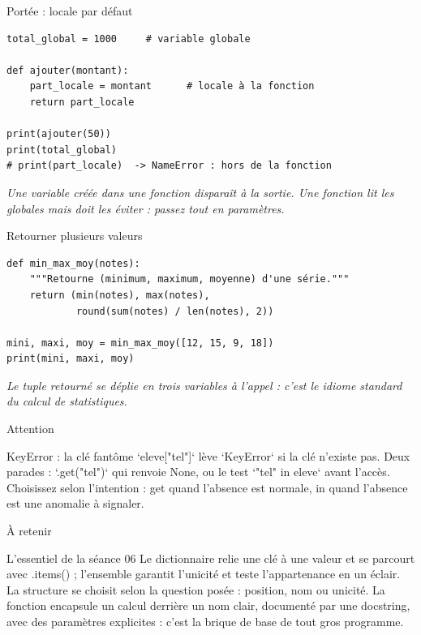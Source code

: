 \documentclass[aspectratio=169,11pt]{beamer}
\begin{document}
\begin{frame}[fragile]{Portée : locale par défaut}

\begin{lstlisting}[style=py]
total_global = 1000     # variable globale

def ajouter(montant):
    part_locale = montant      # locale à la fonction
    return part_locale

print(ajouter(50))
print(total_global)
# print(part_locale)  -> NameError : hors de la fonction
\end{lstlisting}
\vspace{0.5pt}

{\small\color{PyGris}\itshape Une variable créée dans une fonction disparaît à la sortie. Une fonction lit les globales mais doit les éviter : passez tout en paramètres.}

\end{frame}

\begin{frame}[fragile]{Retourner plusieurs valeurs}

\begin{lstlisting}[style=py]
def min_max_moy(notes):
    """Retourne (minimum, maximum, moyenne) d'une série."""
    return (min(notes), max(notes),
            round(sum(notes) / len(notes), 2))

mini, maxi, moy = min_max_moy([12, 15, 9, 18])
print(mini, maxi, moy)
\end{lstlisting}
\vspace{0.5pt}

{\small\color{PyGris}\itshape Le tuple retourné se déplie en trois variables à l'appel : c'est le idiome standard du calcul de statistiques.}

\end{frame}

\begin{frame}{Attention}
\begin{alertblock}{KeyError : la clé fantôme}
`eleve["tel"]` lève `KeyError` si la clé n'existe pas. Deux parades : `.get("tel")` qui renvoie None, ou le test `"tel" in eleve` avant l'accès. Choisissez selon l'intention : get quand l'absence est normale, in quand l'absence est une anomalie à signaler.
\end{alertblock}
\end{frame}

\begin{frame}{À retenir}
\begin{block}{L'essentiel de la séance 06}
Le dictionnaire relie une clé à une valeur et se parcourt avec .items() ; l'ensemble garantit l'unicité et teste l'appartenance en un éclair. La structure se choisit selon la question posée : position, nom ou unicité. La fonction encapsule un calcul derrière un nom clair, documenté par une docstring, avec des paramètres explicites : c'est la brique de base de tout gros programme.
\end{block}
\end{frame}
\end{document}
